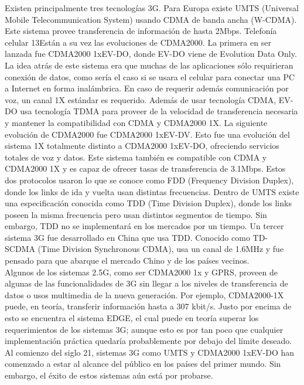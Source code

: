 \documentclass[]{article}
\begin{document}
Existen principalmente tres tecnologías 3G. Para Europa existe UMTS (Universal
Mobile Telecommunication System) usando CDMA de banda ancha (W-CDMA).
Este sistema provee transferencia de información de hasta 2Mbps.
Telefonía celular
13Están a su vez las evoluciones de CDMA2000. La primera en ser lanzada fue
CDMA2000 1xEV-DO, donde EV-DO viene de Evolution Data Only. La idea atrás
de este sistema era que muchas de las aplicaciones sólo requirieran conexión de
datos, como sería el caso si se usara el celular para conectar una PC a Internet en
forma inalámbrica. En caso de requerir además comunicación por voz, un canal 1X
estándar es requerido. Además de usar tecnología CDMA, EV-DO usa tecnología
TDMA para proveer de la velocidad de transferencia necesaria y mantener la
compatibilidad con CDMA y CDMA2000 1X.
La siguiente evolución de CDMA2000 fue CDMA2000 1xEV-DV. Esto fue una
evolución del sistema 1X totalmente distinto a CDMA2000 1xEV-DO, ofreciendo
servicios totales de voz y datos. Este sistema también es compatible con CDMA y
CDMA2000 1X y es capaz de ofrecer tasas de transferencia de 3.1Mbps.
Estos dos protocolos usaron lo que se conoce como FDD (Frequency Division
Duplex), donde los links de ida y vuelta usan distintas frecuencias. Dentro de
UMTS existe una especificación conocida como TDD (Time Division Duplex),
donde los links poseen la misma frecuencia pero usan distintos segmentos de
tiempo. Sin embargo, TDD no se implementará en los mercados por un tiempo.
Un tercer sistema 3G fue desarrollado en China que usa TDD. Conocido como TD-
SCDMA (Time Division Synchronous CDMA), usa un canal de 1.6MHz y fue
pensado para que abarque el mercado Chino y de los países vecinos.\\

Algunos de los sistemas 2.5G, como ser CDMA2000 1x y GPRS, proveen de
algunas de las funcionalidades de 3G sin llegar a los niveles de transferencia de
datos o usos multimedia de la nueva generación. Por ejemplo, CDMA2000-1X
puede, en teoría, transferir información hasta a 307 kbit/s. Justo por encima de esto
se encuentra el sistema EDGE, el cual puede en teoría superar los requerimientos
de los sistemas 3G; aunque esto es por tan poco que cualquier implementación
práctica quedaría probablemente por debajo del límite deseado.
Al comienzo del siglo 21, sistemas 3G como UMTS y CDMA2000 1xEV-DO han
comenzado a estar al alcance del público en los países del primer mundo. Sin
embargo, el éxito de estos sistemas aún está por probarse.\\
\end{document}
